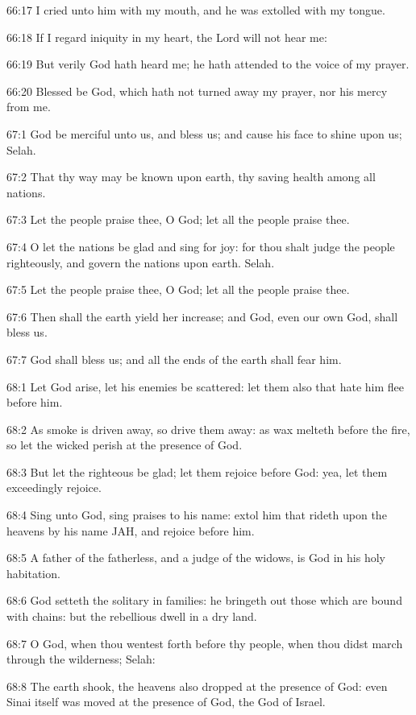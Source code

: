 66:17 I cried unto him with my mouth, and he was extolled with my tongue.

66:18 If I regard iniquity in my heart, the Lord will not hear me:

66:19 But verily God hath heard me; he hath attended to the voice of my prayer.

66:20 Blessed be God, which hath not turned away my prayer, nor his mercy from me.



67:1 God be merciful unto us, and bless us; and cause his face to shine upon us; Selah.

67:2 That thy way may be known upon earth, thy saving health among all nations.

67:3 Let the people praise thee, O God; let all the people praise thee.

67:4 O let the nations be glad and sing for joy: for thou shalt judge the people righteously, and govern the nations upon earth. Selah.

67:5 Let the people praise thee, O God; let all the people praise thee.

67:6 Then shall the earth yield her increase; and God, even our own God, shall bless us.

67:7 God shall bless us; and all the ends of the earth shall fear him.



68:1 Let God arise, let his enemies be scattered: let them also that hate him flee before him.

68:2 As smoke is driven away, so drive them away: as wax melteth before the fire, so let the wicked perish at the presence of God.

68:3 But let the righteous be glad; let them rejoice before God: yea, let them exceedingly rejoice.

68:4 Sing unto God, sing praises to his name: extol him that rideth upon the heavens by his name JAH, and rejoice before him.

68:5 A father of the fatherless, and a judge of the widows, is God in his holy habitation.

68:6 God setteth the solitary in families: he bringeth out those which are bound with chains: but the rebellious dwell in a dry land.

68:7 O God, when thou wentest forth before thy people, when thou didst march through the wilderness; Selah:

68:8 The earth shook, the heavens also dropped at the presence of God: even Sinai itself was moved at the presence of God, the God of Israel.


